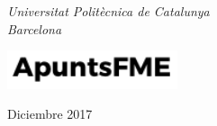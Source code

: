 \begin{titlepage}
	\vspace{3\baselineskip} %

	\textit{Universitat Politècnica de Catalunya \\ Barcelona} %

	\vfill %


	\includegraphics[width=5cm]{../logo.pdf}

	\vspace{0.3\baselineskip} %
        

	Diciembre 2017 %


\end{titlepage}
